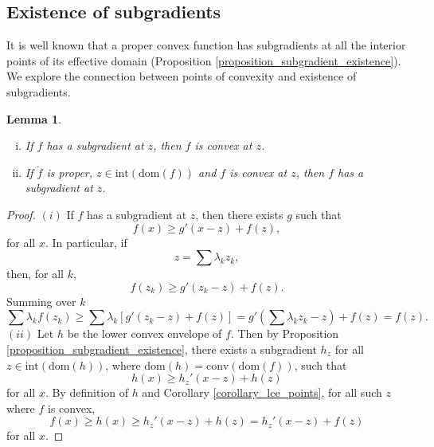 \documentclass[12pt]{article}
\newtheorem{lemma}[theorem]{Lemma}
\begin{document}
\subsection{Existence of subgradients}

It is well known that a proper convex function has subgradients at all the interior points of its effective domain (Proposition \ref{proposition_subgradient_existence}).
We explore the connection between points of convexity and existence of subgradients.

\begin{lemma}
\hspace{1mm}
\begin{enumerate}[i)]
\item
If $f$ has a subgradient at $z$, then $f$ is convex at $z$.
\item
If $\breve{f}$ is proper, $z \in \mathrm{int}(\mathrm{dom}(f))$ and $f$ is convex at $z$, then $f$ has a subgradient at $z$.
\end{enumerate}
\end{lemma}

\begin{proof}
$(i)$
If $f$ has a subgradient at $z$, then there exists $g$ such that
\begin{equation*}
f(x) \ge g'(x-z) + f(z),
\end{equation*}
for all $x$.
In particular, if
\begin{equation*}
z = \sum \lambda_{k} z_{k},
\end{equation*}
then, for all $k$,
\begin{equation*}
f(z_{k}) \ge g'(z_{k} - z) + f(z).
\end{equation*}
Summing over $k$
\begin{equation*}
\sum \lambda_{k} f(z_{k})
\ge \sum \lambda_{k} \left[ g'(z_{k} - z) + f(z) \right]
= g'\left( \sum \lambda_{k} z_{k} - z \right) + f(z)
= f(z).
\end{equation*}
$(ii)$
Let $h$ be the lower convex envelope of $f$.
Then by Proposition \ref{proposition_subgradient_existence}, there exists a subgradient $h_{z}$ for all $z \in \mathrm{int}(\mathrm{dom}(h))$, where $\mathrm{dom}(h) = \mathrm{conv}(\mathrm{dom}(f))$, such that
\begin{equation*}
h(x) \ge h_{z}'(x-z) + h(z)
\end{equation*}
for all $x$.
By definition of $h$ and Corollary \ref{corollary_lce_points}, for all such $z$ where $f$ is convex,
\begin{equation*}
f(x) \ge h(x)
\ge h_{z}'(x -z) + h(z)
= h_{z}'(x -z) + f(z) 
\end{equation*}
for all $x$.
\end{proof}
\end{document}
